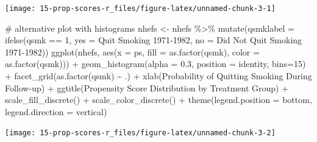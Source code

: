 \documentclass[
  10pt,
  a4paper,
]{book}
\newenvironment{Shaded}{\begin{snugshade}}{\end{snugshade}}
\newcommand{\AttributeTok}[1]{\textcolor[rgb]{0.40,0.45,0.13}{#1}}
\newcommand{\CommentTok}[1]{\textcolor[rgb]{0.37,0.37,0.37}{#1}}
\newcommand{\DecValTok}[1]{\textcolor[rgb]{0.68,0.00,0.00}{#1}}
\newcommand{\FloatTok}[1]{\textcolor[rgb]{0.68,0.00,0.00}{#1}}
\newcommand{\FunctionTok}[1]{\textcolor[rgb]{0.28,0.35,0.67}{#1}}
\newcommand{\NormalTok}[1]{\textcolor[rgb]{0.00,0.46,0.62}{#1}}
\newcommand{\OtherTok}[1]{\textcolor[rgb]{0.00,0.46,0.62}{#1}}
\newcommand{\SpecialCharTok}[1]{\textcolor[rgb]{0.37,0.37,0.37}{#1}}
\newcommand{\StringTok}[1]{\textcolor[rgb]{0.13,0.47,0.30}{#1}}
\begin{document}
\begin{center}\texttt{[image: 15-prop-scores-r\_files/figure-latex/unnamed-chunk-3-1]} \end{center}

\begin{Shaded}
\begin{Highlighting}[]

\CommentTok{\# alternative plot with histograms}
\NormalTok{nhefs }\OtherTok{\textless{}{-}}\NormalTok{ nhefs }\SpecialCharTok{\%\textgreater{}\%} \FunctionTok{mutate}\NormalTok{(}\AttributeTok{qsmklabel =} \FunctionTok{ifelse}\NormalTok{(qsmk }\SpecialCharTok{==} \DecValTok{1}\NormalTok{,}
                       \AttributeTok{yes =} \StringTok{\textquotesingle{}Quit Smoking 1971{-}1982\textquotesingle{}}\NormalTok{,}
                       \AttributeTok{no =} \StringTok{\textquotesingle{}Did Not Quit Smoking 1971{-}1982\textquotesingle{}}\NormalTok{))}
\FunctionTok{ggplot}\NormalTok{(nhefs, }\FunctionTok{aes}\NormalTok{(}\AttributeTok{x =}\NormalTok{ ps, }\AttributeTok{fill =} \FunctionTok{as.factor}\NormalTok{(qsmk), }\AttributeTok{color =} \FunctionTok{as.factor}\NormalTok{(qsmk))) }\SpecialCharTok{+}
  \FunctionTok{geom\_histogram}\NormalTok{(}\AttributeTok{alpha =} \FloatTok{0.3}\NormalTok{, }\AttributeTok{position =} \StringTok{\textquotesingle{}identity\textquotesingle{}}\NormalTok{, }\AttributeTok{bins=}\DecValTok{15}\NormalTok{) }\SpecialCharTok{+}
  \FunctionTok{facet\_grid}\NormalTok{(}\FunctionTok{as.factor}\NormalTok{(qsmk) }\SpecialCharTok{\textasciitilde{}}\NormalTok{ .) }\SpecialCharTok{+}
  \FunctionTok{xlab}\NormalTok{(}\StringTok{\textquotesingle{}Probability of Quitting Smoking During Follow{-}up\textquotesingle{}}\NormalTok{) }\SpecialCharTok{+}
  \FunctionTok{ggtitle}\NormalTok{(}\StringTok{\textquotesingle{}Propensity Score Distribution by Treatment Group\textquotesingle{}}\NormalTok{) }\SpecialCharTok{+}
  \FunctionTok{scale\_fill\_discrete}\NormalTok{(}\StringTok{\textquotesingle{}\textquotesingle{}}\NormalTok{) }\SpecialCharTok{+}
  \FunctionTok{scale\_color\_discrete}\NormalTok{(}\StringTok{\textquotesingle{}\textquotesingle{}}\NormalTok{) }\SpecialCharTok{+}
  \FunctionTok{theme}\NormalTok{(}\AttributeTok{legend.position =} \StringTok{\textquotesingle{}bottom\textquotesingle{}}\NormalTok{, }\AttributeTok{legend.direction =} \StringTok{\textquotesingle{}vertical\textquotesingle{}}\NormalTok{)}
\end{Highlighting}
\end{Shaded}

\begin{center}\texttt{[image: 15-prop-scores-r\_files/figure-latex/unnamed-chunk-3-2]} \end{center}
\end{document}
